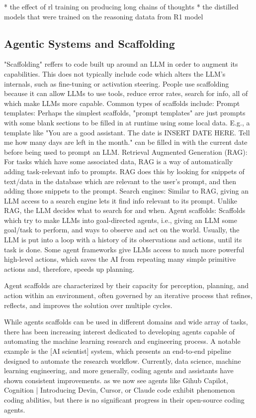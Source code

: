 * the effect of rl training on producing long chains of thoughts
* the distilled models that were trained on the reasoning datata from R1 model

\subsection{Agentic Systems and Scaffolding}
"Scaffolding" reffers to code built up around an LLM in order to augment its capabilities. This does not typically include code which alters the LLM's internals, such as fine-tuning or activation steering. People use scaffolding because it can allow LLMs to use tools, reduce error rates, search for info, all of which make LLMs more capable.
Common types of scaffolds include:
Prompt templates: Perhaps the simplest scaffolds, "prompt templates" are just prompts with some blank sections to be filled in at runtime using some local data. E.g., a template like "You are a good assistant. The date is {INSERT DATE HERE}. Tell me how many days are left in the month." can be filled in with the current date before being used to prompt an LLM.
Retrieval Augmented Generation (RAG): For tasks which have some associated data, RAG is a way of automatically adding task-relevant info to prompts. RAG does this by looking for snippets of text/data in the database which are relevant to the user's prompt, and then adding those snippets to the prompt.
Search engines: Similar to RAG, giving an LLM access to a search engine lets it find info relevant to its prompt. Unlike RAG, the LLM decides what to search for and when.
Agent scaffolds: Scaffolds which try to make LLMs into goal-directed agents, i.e., giving an LLM some goal/task to perform, and ways to observe and act on the world. Usually, the LLM is put into a loop with a history of its observations and actions, until its task is done. Some agent frameworks give LLMs access to much more powerful high-level actions, which saves the AI from repeating many simple primitive actions and, therefore, speeds up planning.

Agent scaffolds are characterized by their capacity for perception, planning, and action within an environment, often governed by an iterative process that refines, reflects, and improves the solution over multiple cycles.

While agents scaffolds can be used in different domains and wide array of tasks, there has been increasing interest dedicated to developing agents capable of automating the machine learning research and engineering process. A notable example is the [AI scientist] system, which presents an end-to-end pipeline designed to automate the research workflow. Currently, data science, machine learning engineering, and more generally, coding agents and assistants have shown consistent improvements. as we now see agents like Gihub Capilot, Cognition | Introducing Devin, Cursor, or Claude code exhibit phenomenon coding abilities, but there is no significant progress in their open-source coding agents. 

